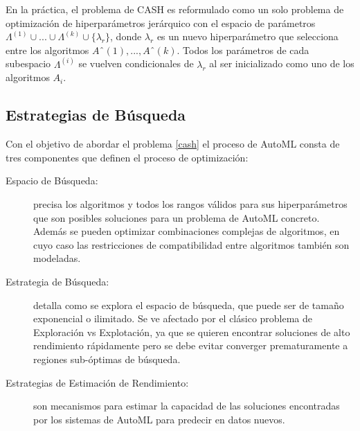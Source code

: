 
En la práctica, el problema de CASH es reformulado como un solo problema de optimización de hiperparámetros jerárquico con el espacio de parámetros $\Lambda^{(1)}\cup ... \cup \Lambda^{(k)} \cup\{\lambda_r\}$, donde $\lambda_r$ es un nuevo hiperparámetro que selecciona entre los algoritmos $Aˆ{(1)}, ..., Aˆ{(k)}$. Todos los parámetros de cada subespacio $\Lambda^{(i)}$ se vuelven condicionales de $\lambda_r$ al ser inicializado como uno de los algoritmos $A_i$.
 
\subsection{Estrategias de Búsqueda}\label{subsec:automl_methods}


Con el objetivo de abordar el problema \ref{cash} el proceso de AutoML consta de tres componentes que definen el proceso de optimización:

\begin{description}
	\item[Espacio de Búsqueda:] precisa los algoritmos y todos los rangos válidos para sus hiperparámetros que son posibles soluciones para un problema de AutoML concreto. Además se pueden optimizar combinaciones complejas de algoritmos, en cuyo caso las restricciones de compatibilidad entre algoritmos también son modeladas.
	\item[Estrategia de Búsqueda:] detalla como se explora el espacio de búsqueda, que puede ser de tamaño exponencial o ilimitado. Se ve afectado por el clásico problema de Exploración vs Explotación, ya que se quieren encontrar soluciones de alto rendimiento rápidamente pero se debe evitar converger prematuramente a regiones sub-óptimas de búsqueda.
	\item[Estrategias de Estimación de Rendimiento:] son mecanismos para estimar la capacidad de las soluciones encontradas por los sistemas de AutoML para predecir en datos nuevos.
\end{description}

